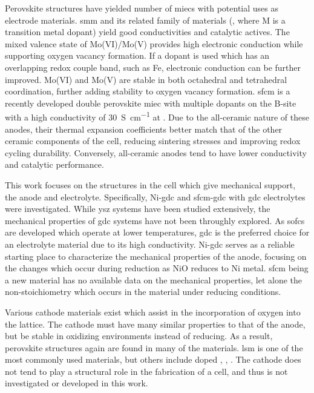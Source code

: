     Perovskite structures have yielded number of \glspl{miec} with potential uses as electrode materials. \cite{Yamamoto1987,Anderson1992,Ishihara2009}
    \gls{smm} and its related family of materials (, where M is a transition metal dopant) yield good conductivities and catalytic actives.\cite{Huang2009}
    The mixed valence state of Mo(VI)/Mo(V) provides high electronic conduction while supporting oxygen vacancy formation.\cite{Huang2006a}
    If a dopant is used which has an overlapping redox couple band, such as Fe, electronic conduction can be further improved.
    Mo(VI) and Mo(V) are stable in both octahedral and tetrahedral coordination, further adding stability to oxygen vacancy formation.\cite{Bernuy-Lopez2007}
    \gls{sfcm} is a recently developed double perovskite \gls{miec} with multiple dopants on the B-site with a high conductivity of \SI{30}{S\per\centi\meter} at .\cite{Pan,Hussaina,Hussain}
    Due to the all-ceramic nature of these anodes, their thermal expansion coefficients better match that of the other ceramic components of the cell, reducing sintering stresses and improving redox cycling durability.\cite{Goodenough2007}
    Conversely, all-ceramic anodes tend to have lower conductivity and catalytic performance.\cite{Zhang2012}

    This work focuses on the structures in the cell which give mechanical support, the anode and electrolyte.
    Specifically, Ni-\gls{gdc} and \gls{sfcm}-\gls{gdc} with \gls{gdc} electrolytes were investigated.
    While \gls{ysz} systems have been studied extensively, the mechanical properties of \gls{gdc} systems have not been throughly explored.
    As \glspl{sofc} are developed which operate at lower temperatures, \gls{gdc} is the preferred choice for an electrolyte material due to its high conductivity.
    Ni-\gls{gdc} serves as a reliable starting place to characterize the mechanical properties of the anode, focusing on the changes which occur during reduction as NiO reduces to Ni metal.
    \gls{sfcm} being a new material has no available data on the mechanical properties, let alone the non-stoichiometry which occurs in the material under reducing conditions.

    Various cathode materials exist which assist in the incorporation of oxygen into the lattice.
    The cathode must have many similar properties to that of the anode, but be stable in oxidizing environments instead of reducing.
    As a result, perovskite structures again are found in many of the materials.
    \Gls{lsm} is one of the most commonly used materials, but others include doped , , . \cite{Minh2004, Cascos2016, Chen2015, Kuhn2013}
    The cathode does not tend to play a structural role in the fabrication of a cell, and thus is not investigated or developed in this work.

